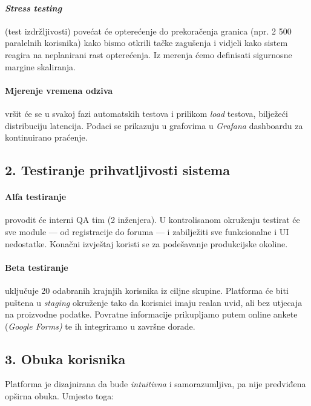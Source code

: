 \paragraph{\emph{Stress testing}} (test izdržljivosti) povećat će opterećenje do prekoračenja granica (npr. 2 500 paralelnih korisnika) kako bismo otkrili tačke zagušenja i vidjeli kako sistem reagira na neplanirani rast opterećenja. Iz merenja ćemo definisati sigurnosne margine skaliranja.

\paragraph{Mjerenje vremena odziva} vršit će se u svakoj fazi automatskih testova i prilikom \emph{load} testova, bilježeći distribuciju latencija. Podaci se prikazuju u grafovima u \emph{Grafana} dashboardu za kontinuirano praćenje.

\subsection*{2. Testiranje prihvatljivosti sistema}

\paragraph{Alfa testiranje} provodit će interni QA tim (2 inženjera). U kontrolisanom okruženju testirat će sve module — od registracije do foruma — i zabilježiti sve funkcionalne i UI nedostatke. Konačni izvještaj koristi se za podešavanje produkcijske okoline.

\paragraph{Beta testiranje} uključuje 20 odabranih krajnjih korisnika iz ciljne skupine. Platforma će biti puštena u \emph{staging} okruženje tako da korisnici imaju realan uvid, ali bez utjecaja na proizvodne podatke. Povratne informacije prikupljamo putem online ankete (\emph{Google Forms)} te ih integriramo u završne dorade.

\subsection*{3. Obuka korisnika}

Platforma je dizajnirana da bude \emph{intuitivna} i samorazumljiva, pa nije predviđena opširna obuka. Umjesto toga:

